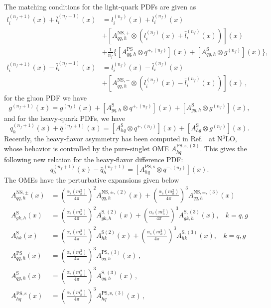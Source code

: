 \documentclass[12pt,notitlepage,aps,preprintnumbers,superscriptaddress,nofootinbib,aps,prd,floatfix]{revtex4-2}
\begin{document}
The matching conditions for the light-quark PDFs are given as~\cite{Buza:1995ie,Buza:1996wv}
%
\begin{align}
l_i^{(n_f+1)}(x) + \bar{l}_i^{(n_f+1)}(x) &= l_i^{(n_f)}(x) + \bar{l}_i^{(n_f)}(x) \nonumber \\
&+ \left[ A_{qq,h}^{\mathrm{NS},+} \otimes \left( l_i^{(n_f)}(x) + \bar{l}_i^{(n_f)}(x) \right) \right](x) \nonumber \\
&+ \frac{1}{n_f} \Big\{ \left[A_{qq,h}^{\mathrm{PS}} \otimes q^{+,(n_f)} \right](x) + \left[ A_{qg,h}^{\mathrm{S}} \otimes g^{(n_f)} \right](x) \Big\}, \\
l_i^{(n_f+1)}(x) - \bar{l}_i^{(n_f+1)}(x) &= l_i^{(n_f)}(x) - \bar{l}_i^{(n_f)}(x) \nonumber \\
&+ \left[ A_{qq,h}^{\mathrm{NS},-} \otimes (l_i^{(n_f)}(x) - \bar{l}_i^{(n_f)}(x)) \right](x)\,,
\end{align}
%
for the gluon PDF we have
%
\begin{equation}
g^{(n_f+1)}(x) = g^{(n_f)}(x) + \left[ A_{gq,h}^{\mathrm{S}} \otimes q^{+,(n_f)} \right](x) + [A_{gg,h}^{\mathrm{S}} \otimes g^{(n_f)}](x),
\end{equation}
%
and for the heavy-quark PDFs, we have   
%
\begin{equation}
q_h^{(n_f+1)}(x) + \bar{q}^{(n_f+1)}(x) = [A_{hq}^{\mathrm{S}} \otimes q^{+,(n_f)}](x) + [A_{hg}^{\mathrm{S}} \otimes g^{(n_f)}](x).
\end{equation}
%
Recently, the heavy-flavor asymmetry has been computed in Ref.~\cite{Behring:2025avs} at N$^3$LO, whose behavior is controlled by the pure-singlet OME $A_{hq}^{\mathrm{PS},\mathrm{s},(3)}$. This gives the following new relation for the heavy-flavor difference PDF:
%
\begin{equation}
  q_h^{(n_f+1)}(x) - \bar{q}_h^{(n_f+1)} = [A_{hq}^{\mathrm{PS},\mathrm{s}} \otimes q^{-,(n_f)}](x).
\end{equation}
%
The OMEs have the perturbative expansions given below  
%
\begin{align}
A^{\textrm{NS},\pm}_{qq,h}(x) &= \left(\frac{\alpha_s(m_h^2)}{4\pi}\right)^2 A^{\textrm{NS},\pm,(2)}_{qq,h}(x) + 
\left(\frac{\alpha_s(m_h^2)}{4\pi}\right)^3 A^{\textrm{NS},\pm,(3)}_{qq,h}(x) \\
A^{\textrm{S}}_{gk,h}(x) &= \left(\frac{\alpha_s(m_h^2)}{4\pi}\right)^2 A^{\textrm{S},(2)}_{gk,h}(x) + 
\left(\frac{\alpha_s(m_h^2)}{4\pi}\right)^3 A^{\textrm{S},(3)}_{gk,h}(x),~~~~ k = q,g \\
A^{\textrm{S}}_{hk}(x) &= \left(\frac{\alpha_s(m_h^2)}{4\pi}\right)^2 A^{\textrm{S}(2)}_{hk}(x) + 
\left(\frac{\alpha_s(m_h^2)}{4\pi}\right)^3 A^{\textrm{S},(3)}_{hk}(x),~~~~ k = q,g \\
A^{\textrm{PS}}_{qq,h}(x) &= \left(\frac{\alpha_s(m_h^2)}{4\pi}\right)^3 A^{\textrm{PS},(3)}_{qq,h}(x)\,, \\
A^{\textrm{S}}_{qg,h}(x) &= \left(\frac{\alpha_s(m_h^2)}{4\pi}\right)^3 A^{\textrm{S},(3)}_{qg,h}(x)\,, \\
A_{hq}^{\mathrm{PS},\mathrm{s}}(x) &= \left(\frac{\alpha_s(m_h^2)}{4\pi}\right)^3 A_{hq}^{\mathrm{PS},\mathrm{s},(3)}(x)\,,
\end{align}
\end{document}
